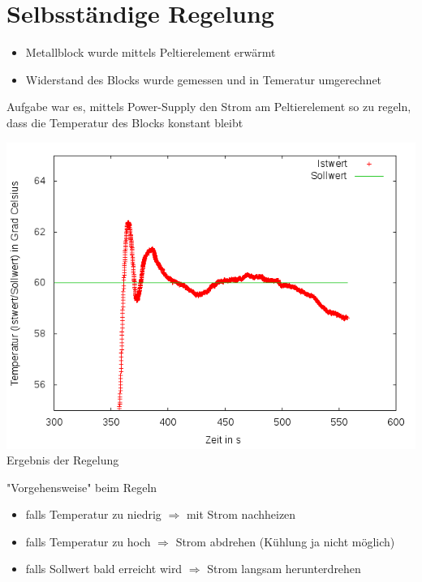 \documentclass[compress,11pt]{beamer}
\begin{document}
\section{Selbsständige Regelung}
\begin{frame}


\begin{itemize}
\item Metallblock wurde mittels Peltierelement erwärmt
\item Widerstand des Blocks wurde gemessen und in Temeratur umgerechnet
\end{itemize}
Aufgabe war es, mittels Power-Supply den Strom am Peltierelement so zu regeln, dass die Temperatur des Blocks konstant bleibt
\end{frame}
\begin{frame}
\includegraphics[width=.7\textwidth]{../2aufgabe/2a_T_genauer}\\
Ergebnis der Regelung
\end{frame}
\begin{frame}
\begin{block}{"Vorgehensweise" beim Regeln}
\begin{itemize}
\item falls Temperatur zu niedrig $\Rightarrow$ mit Strom nachheizen
\item falls Temperatur zu hoch $\Rightarrow$ Strom abdrehen (Kühlung ja nicht möglich)
\item falls Sollwert bald erreicht wird $\Rightarrow$ Strom langsam herunterdrehen
\end{itemize}
\end{block}
\end{frame}
\end{document}
